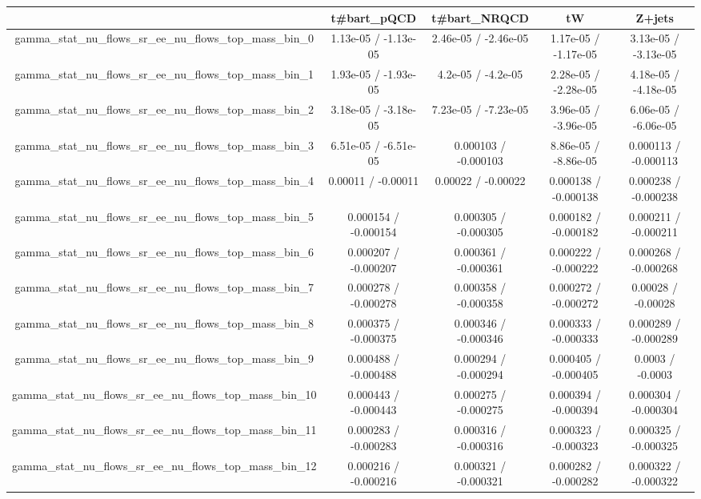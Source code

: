 \documentclass[10pt]{article}
\begin{document}
\begin{table}[htbp]
\begin{center}
\begin{tabular}{|c|c|c|c|c|}
\hline 
      & t#bar{t}_{pQCD}      & t#bar{t}_{NRQCD}      & tW      & Z+jets \\ 
\hline 
  gamma_stat_nu_flows_sr_ee_nu_flows_top_mass_bin_0 & 1.13e-05 / -1.13e-05 & 2.46e-05 / -2.46e-05 & 1.17e-05 / -1.17e-05 & 3.13e-05 / -3.13e-05 \\ 
  gamma_stat_nu_flows_sr_ee_nu_flows_top_mass_bin_1 & 1.93e-05 / -1.93e-05 & 4.2e-05 / -4.2e-05 & 2.28e-05 / -2.28e-05 & 4.18e-05 / -4.18e-05 \\ 
  gamma_stat_nu_flows_sr_ee_nu_flows_top_mass_bin_2 & 3.18e-05 / -3.18e-05 & 7.23e-05 / -7.23e-05 & 3.96e-05 / -3.96e-05 & 6.06e-05 / -6.06e-05 \\ 
  gamma_stat_nu_flows_sr_ee_nu_flows_top_mass_bin_3 & 6.51e-05 / -6.51e-05 & 0.000103 / -0.000103 & 8.86e-05 / -8.86e-05 & 0.000113 / -0.000113 \\ 
  gamma_stat_nu_flows_sr_ee_nu_flows_top_mass_bin_4 & 0.00011 / -0.00011 & 0.00022 / -0.00022 & 0.000138 / -0.000138 & 0.000238 / -0.000238 \\ 
  gamma_stat_nu_flows_sr_ee_nu_flows_top_mass_bin_5 & 0.000154 / -0.000154 & 0.000305 / -0.000305 & 0.000182 / -0.000182 & 0.000211 / -0.000211 \\ 
  gamma_stat_nu_flows_sr_ee_nu_flows_top_mass_bin_6 & 0.000207 / -0.000207 & 0.000361 / -0.000361 & 0.000222 / -0.000222 & 0.000268 / -0.000268 \\ 
  gamma_stat_nu_flows_sr_ee_nu_flows_top_mass_bin_7 & 0.000278 / -0.000278 & 0.000358 / -0.000358 & 0.000272 / -0.000272 & 0.00028 / -0.00028 \\ 
  gamma_stat_nu_flows_sr_ee_nu_flows_top_mass_bin_8 & 0.000375 / -0.000375 & 0.000346 / -0.000346 & 0.000333 / -0.000333 & 0.000289 / -0.000289 \\ 
  gamma_stat_nu_flows_sr_ee_nu_flows_top_mass_bin_9 & 0.000488 / -0.000488 & 0.000294 / -0.000294 & 0.000405 / -0.000405 & 0.0003 / -0.0003 \\ 
  gamma_stat_nu_flows_sr_ee_nu_flows_top_mass_bin_10 & 0.000443 / -0.000443 & 0.000275 / -0.000275 & 0.000394 / -0.000394 & 0.000304 / -0.000304 \\ 
  gamma_stat_nu_flows_sr_ee_nu_flows_top_mass_bin_11 & 0.000283 / -0.000283 & 0.000316 / -0.000316 & 0.000323 / -0.000323 & 0.000325 / -0.000325 \\ 
  gamma_stat_nu_flows_sr_ee_nu_flows_top_mass_bin_12 & 0.000216 / -0.000216 & 0.000321 / -0.000321 & 0.000282 / -0.000282 & 0.000322 / -0.000322 \\ 

\end{tabular}
\end{center}
\end{table}
\end{document}
